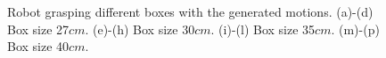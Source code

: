 \begin{figure}
  \hspace{-1.2cm}
  \begin{minipage}[c]{1\textwidth}
  \end{minipage}


    \vspace{-0.5cm}
    \caption{ \scriptsize{Robot grasping different boxes with the generated motions.
  (a)-(d) Box size 27$cm$. (e)-(h) Box size 30$cm$. (i)-(l) Box size 35$cm$. (m)-(p) Box size 40$cm$.}}
    \label{graspdemo2}
\end{figure}

